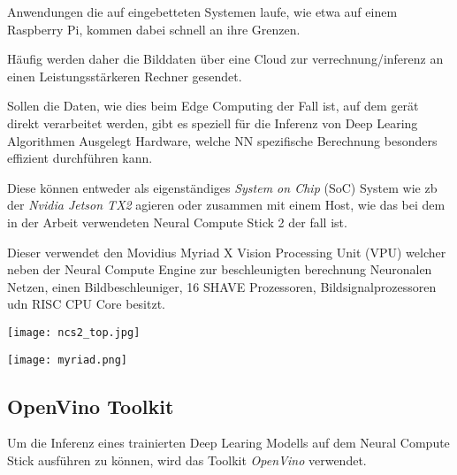 Anwendungen die auf eingebetteten Systemen laufe, wie etwa 
auf einem Raspberry Pi, kommen dabei schnell an ihre 
Grenzen.

Häufig werden daher die Bilddaten über eine Cloud zur 
verrechnung/inferenz an einen Leistungsstärkeren 
Rechner gesendet.

Sollen die Daten, wie dies beim Edge Computing der Fall ist, 
auf dem gerät direkt verarbeitet werden, gibt es speziell 
für die Inferenz von Deep Learing Algorithmen Ausgelegt 
Hardware, welche NN spezifische Berechnung besonders 
effizient durchführen kann.

Diese können entweder als eigenständiges \textit{System on Chip}
(SoC) System wie zb der \textit{Nvidia Jetson TX2} agieren oder 
zusammen mit einem Host, wie das bei dem in der Arbeit verwendeten 
Neural Compute Stick 2 der fall ist.

Dieser verwendet den Movidius Myriad X Vision Processing Unit (VPU)
welcher neben der Neural Compute Engine zur beschleunigten berechnung 
Neuronalen Netzen, einen Bildbeschleuniger, 16 SHAVE Prozessoren, 
Bildsignalprozessoren udn RISC CPU Core besitzt.
\cite{haussermannFunktionUndEffizienz}
\\[1cm]
\begin{minipage}{0.4\textwidth}
    \centering
    \label{fig:ncs2}
    \texttt{[image: ncs2\_top.jpg]}
\end{minipage}
\begin{minipage}{0.6\textwidth}
    \centering
    \label{fig:myriad}
    \texttt{[image: myriad.png]}
\end{minipage}


\subsection{OpenVino Toolkit}



Um die Inferenz eines trainierten Deep Learing Modells auf dem
Neural Compute Stick ausführen zu können, wird das Toolkit 
\textit{OpenVino} verwendet.

